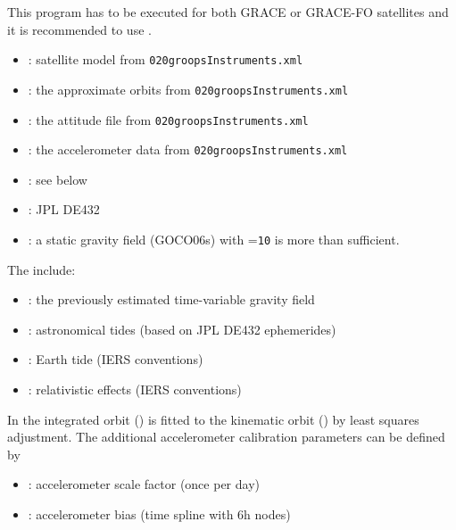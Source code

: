 This program has to be executed for both GRACE or GRACE-FO satellites and it is recommended
to use .
\begin{itemize}
    \item {}: satellite model from \verb|020groopsInstruments.xml|
    \item {}: the approximate orbits from \verb|020groopsInstruments.xml|
    \item {}: the attitude file from \verb|020groopsInstruments.xml|
    \item {}: the accelerometer data from
    \verb|020groopsInstruments.xml|
    \item {}: see below
    \item {}: JPL DE432
    \item {}: a static gravity field (GOCO06s) with =\verb|10| is more than sufficient.
\end{itemize}

The  include:
\begin{itemize}
  \item {}:
        the previously estimated time-variable gravity field
  \item {}: astronomical tides (based on JPL DE432 ephemerides)
  \item {}: Earth tide (IERS conventions)
  \item {}:
        relativistic effects (IERS conventions)
\end{itemize}

In  the integrated orbit
() is fitted to the kinematic orbit
() by least squares adjustment. The additional accelerometer
calibration parameters can be defined by
\begin{itemize}
  \item {}: accelerometer scale factor (once per day)
  \item {}: accelerometer bias (time spline with 6h nodes)
\end{itemize}


